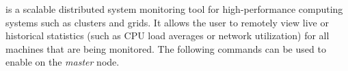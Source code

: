 \Ganglia{} is a scalable distributed system monitoring tool for high-performance
computing systems such as clusters and grids. It allows the user to remotely
view live or historical statistics (such as CPU load averages or network
utilization) for all machines that are being monitored.  The following commands
can be used to enable  \Ganglia{} on the {\em master} node.
